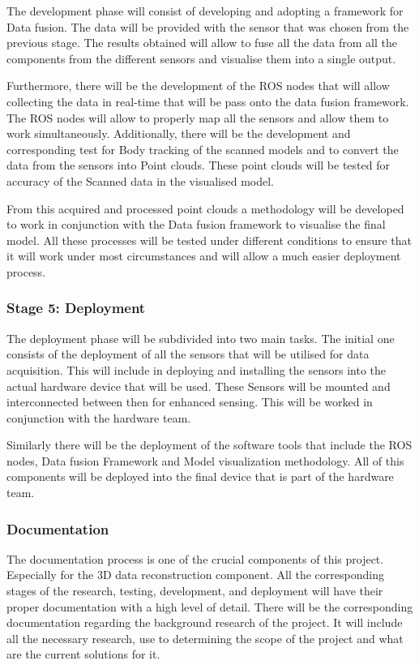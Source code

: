 \documentclass[12pt]{report}
\begin{document}
The development phase will consist of developing and adopting a framework for Data fusion. The data will be provided with the sensor that was chosen from the previous stage. 
The results obtained will allow to fuse all the data from all the components from the different sensors and visualise them into a single output.

Furthermore, there will be the development of the ROS nodes that will allow collecting the data in real-time that will be pass onto the data fusion framework.
The ROS nodes will allow to properly map all the sensors and allow them to work simultaneously. Additionally, there will be the development and corresponding test for Body tracking of the scanned models and to convert the data from the sensors into Point clouds. 
These point clouds will be tested for accuracy of the Scanned data in the visualised model. 

From this acquired and processed point clouds a methodology will be developed to work in conjunction with the Data fusion framework to visualise the final model. 
All these processes will be tested under different conditions to ensure that it will work under most circumstances and will allow a much easier deployment process. 

\subsubsection{Stage 5: Deployment}
The deployment phase will be subdivided into two main tasks. The initial one  consists of the deployment of all the sensors that will be utilised for data acquisition. 
This will include in deploying and installing the sensors into the actual hardware device that will be used. 
These Sensors will be mounted and interconnected between then for enhanced sensing. This will be worked in conjunction with the hardware team. 

Similarly there will be the deployment of the software tools that include the ROS nodes, Data fusion Framework and Model visualization methodology. 
All of this components will be deployed into the final device that is part of the hardware team. 


\subsubsection{Documentation}
The documentation process is one of the crucial components of this project. 
Especially for the 3D data reconstruction component. All the corresponding stages of the research, testing, development, and deployment will have their proper documentation with a high level of detail. 
There will be the corresponding documentation regarding the background research of the project. 
It will include all the necessary research, use to determining the scope of the project and what are the current solutions for it. 
\end{document}
